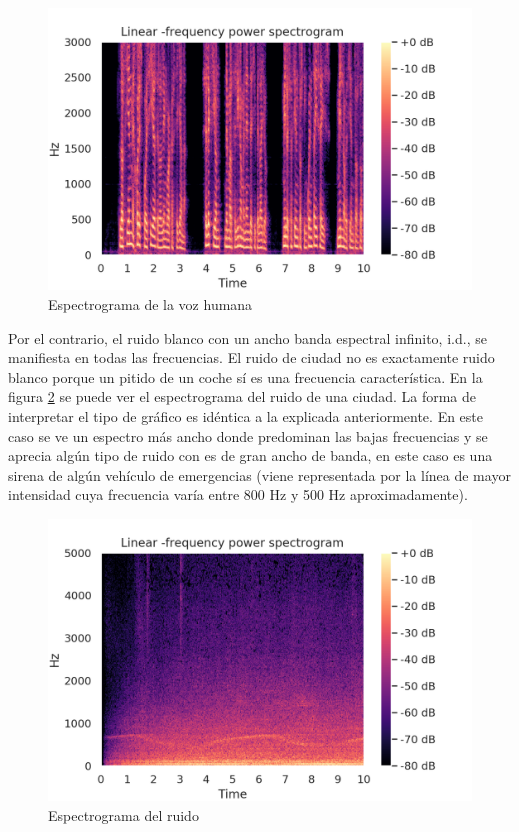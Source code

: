 \begin{figure}[ht!]
	\centering
	\includegraphics[width=0.9\columnwidth]{figures/audio_book_spectrogram.png}
	\caption{Espectrograma de la voz humana}
	\label{fig: voice_spectral}
\end{figure}

Por el contrario, el ruido blanco con un ancho banda espectral infinito, i.d., se manifiesta en todas las frecuencias. El ruido de ciudad no es exactamente ruido blanco porque un pitido de un coche sí es una frecuencia característica. En la figura \ref{fig: noise_spectral} se puede ver el espectrograma del ruido de una ciudad. La forma de interpretar el tipo de gráfico es idéntica a la explicada anteriormente. En este caso se ve un espectro más ancho donde predominan las bajas frecuencias y se aprecia algún tipo de ruido con es de gran ancho de banda, en este caso es una sirena de algún vehículo de emergencias (viene representada por la línea de mayor intensidad cuya frecuencia varía entre 800 Hz y 500 Hz aproximadamente).

\begin{figure}[t!]
	\centering
	\includegraphics[width=0.9\columnwidth]{figures/noise_spectrogram.png}
	\caption{Espectrograma del ruido}
	\label{fig: noise_spectral}
\end{figure}

